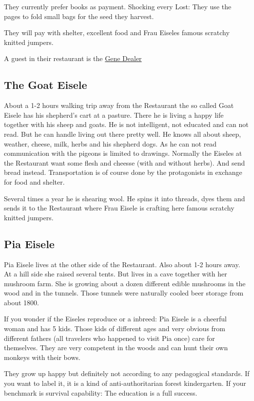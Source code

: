 They currently prefer books as payment. Shocking every Lost: They use the pages to fold small bags for the seed they harvest.

They will pay with shelter, excellent food and Frau Eiseles famous scratchy knitted jumpers.

A guest in their restaurant is the \hyperref[sec:Gene Dealer]{Gene Dealer}

\subsection{The Goat Eisele}

About a 1-2 hours walking trip away from the Restaurant the so called Goat Eisele has his shepherd's cart at a pasture. There he is living a happy life together with his sheep and goats.
He is not intelligent, not educated and can not read. But he can handle living out there pretty well. He knows all about sheep, weather, cheese, milk, herbs and his shepherd dogs.
As he can not read communication with the pigeons is limited to drawings.
Normally the Eiseles at the Restaurant want some flesh and cheesse (with and without herbs). And send bread instead. Transportation is of course done by the protagonists in exchange for food and shelter.

Several times a year he is shearing wool. He spins it into threads, dyes them and sends it to the Restaurant where Frau Eisele is crafting here famous scratchy knitted jumpers.

\subsection{Pia Eisele}

Pia Eisele lives at the other side of the Restaurant. Also about 1-2 hours away. At a hill side she raised several tents. But lives in a cave together with her mushroom farm. She is growing about a dozen different edible mushrooms in the wood and in the tunnels.
Those tunnels were naturally cooled beer storage from about 1800.

If you wonder if the Eiseles reproduce or a inbreed:
Pia Eisele is a cheerful woman and has 5 kids. Those kids of different ages and very obvious from different fathers (all travelers who happened to visit Pia once) care for themselves. They are very competent in the woods and can hunt their own monkeys with their bows.

They grow up happy but definitely not according to any pedagogical standards. If you want to label it, it is a kind of anti-authoritarian forest kindergarten. If your benchmark is survival capability: The education is a full success.

